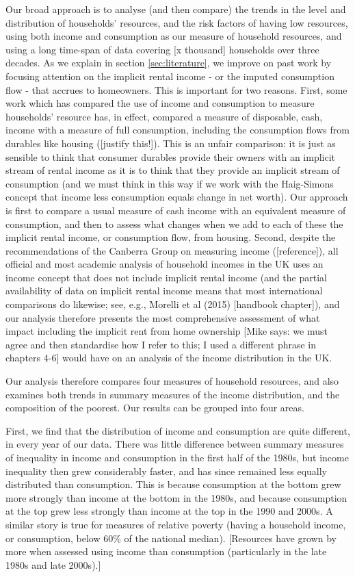 Our broad approach is to analyse (and then compare) the trends in the level and distribution of households' resources, and the risk factors of having low resources, using both income and consumption as our measure of household resources, and using a long time-span of data covering [x thousand] households over three decades. 
As we explain in section \ref{sec:literature}, we improve on past work by focusing attention on the implicit rental income - or the imputed consumption flow - that accrues to homeowners. This is important for two reasons. First, some work which has compared the use of income and consumption to measure households' resource has, in effect, compared a measure of disposable, cash, income with a measure of full consumption, including the consumption flows from durables like housing ([justify this!]). This is an unfair comparison: it is just as sensible to think that consumer durables provide their owners with an implicit stream of rental income as it is to think that they provide an implicit stream of consumption (and we must think in this way if we work with the Haig-Simons concept that income less consumption equals change in net worth). Our approach is first to compare a usual measure of cash income with an equivalent measure of consumption, and then to assess what changes when we add to each of these the implicit rental income, or consumption flow, from housing.  Second, despite the recommendations of the Canberra Group on measuring income ([reference]), all official and most academic analysis of household incomes in the UK uses an income concept that does not include implicit rental income (and the partial availability of data on implicit rental income means that most international comparisons do likewise; see, e.g., Morelli et al (2015) [handbook chapter]), and our analysis therefore presents the most comprehensive assessment of what impact including the implicit rent from home ownership [Mike says: we must agree and then standardise how I refer to this; I used a different phrase in chapters 4-6] would have on an analysis of the income distribution in the UK.    

Our analysis therefore compares four measures of household resources, and also examines both trends in summary measures of the income distribution, and the composition of the poorest. Our results can be grouped into four areas. 

First, we find that the distribution of income and consumption are quite different, in every year of our data. There was little difference between summary measures of inequality in income and consumption in the first half of the 1980s, but income inequality then grew considerably faster, and has since remained less equally distributed than consumption. This is because  consumption at the bottom grew more strongly than income at the bottom in the 1980s, and because consumption at the top grew less strongly than income at the top in the 1990 and 2000s. A similar story is true for measures of relative poverty (having a household income, or consumption, below 60\% of the national median). [Resources have grown by more when assessed using income than consumption (particularly in the late 1980s and late 2000s).]  

